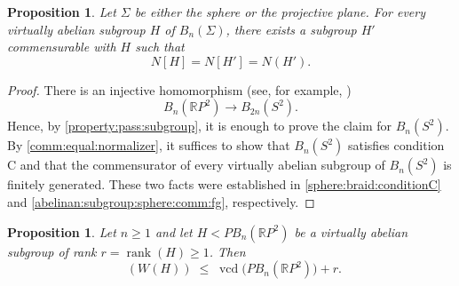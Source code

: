 \documentclass[a4paper,12pt,leqno]{amsart}
\newtheorem{proposition}[theorem]{Proposition}
\theoremstyle{definition}
\newcommand{\calF}{{\mathcal F}}
\DeclareMathOperator{\vcd}{vcd}
\DeclareMathOperator{\gdfin}{gd_{\calF_0}}
\DeclareMathOperator{\rank}{rank}
\begin{document}
\begin{proposition}\label{comm:realize:normalizer:pure:projec}
Let $\Sigma$ be either the sphere or the projective plane. For every virtually abelian subgroup $H$ of $B_n(\Sigma)$, there exists a subgroup $H'$ commensurable with $H$ such that
\[
N[H]=N[H']=N(H').
\]
\end{proposition}

\begin{proof}
There is an injective homomorphism (see, for example,
\cite{MR2927811})
\[
B_n(\mathbb{R}P^2)\longrightarrow B_{2n}(S^2).
\]
Hence, by \cref{property:pass:subgroup}, it is enough to prove the claim for $B_n(S^2)$. By \cref{comm:equal:normalizer}, it suffices to show that $B_n(S^2)$ satisfies condition C and that the commensurator of every virtually abelian subgroup of $B_n(S^2)$ is finitely generated. These two facts were established in \cref{sphere:braid:conditionC} and \cref{abelinan:subgroup:sphere:comm:fg}, respectively.
\end{proof}




\begin{proposition}\label{proper:dim:weyl:pure:projec}
Let $n\ge 1$ and let $H<PB_n(\mathbb{R}P^2)$ be a virtually abelian subgroup of rank $r=\rank(H)\ge 1$. Then
\[
\gdfin(W(H)) \;\le\; \vcd\big(PB_n(\mathbb{R}P^2)\big)+r.
\]
\end{proposition}
\end{document}
